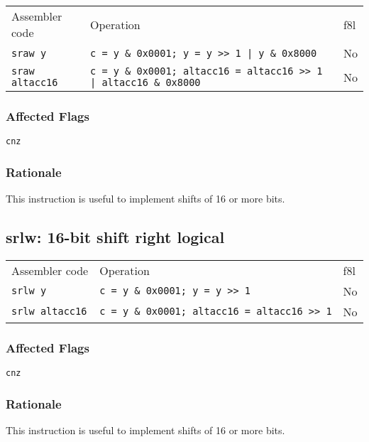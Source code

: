 \documentclass{book}
\begin{document}
\begin{tabular}{l l l}
Assembler code         & Operation                                                               & f8l \\
\texttt{sraw y}        & \texttt{c = y \& 0x0001; y = y >> 1 | y \& 0x8000}                      & No \\
\texttt{sraw altacc16} & \texttt{c = y \& 0x0001; altacc16 = altacc16 >> 1 | altacc16 \& 0x8000} & No \\
\end{tabular}

\subsubsection*{Affected Flags}

\texttt{cnz}

\subsubsection*{Rationale}

This instruction is useful to implement shifts of 16 or more bits.


\subsection{srlw: 16-bit shift right logical}

\begin{tabular}{l l l}
Assembler code         & Operation                                          & f8l \\
\texttt{srlw y}        & \texttt{c = y \& 0x0001; y = y >> 1}               & No \\
\texttt{srlw altacc16} & \texttt{c = y \& 0x0001; altacc16 = altacc16 >> 1} & No \\
\end{tabular}

\subsubsection*{Affected Flags}

\texttt{cnz}

\subsubsection*{Rationale}

This instruction is useful to implement shifts of 16 or more bits.
\end{document}
